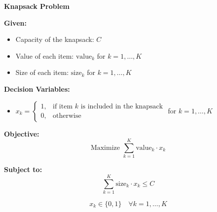 \documentclass{article}
\begin{document}
\textbf{Knapsack Problem}

\textbf{Given:}
\begin{itemize}
    \item Capacity of the knapsack: \( C \)
    \item Value of each item: \( \text{value}_k \) for \( k = 1, \ldots, K \)
    \item Size of each item: \( \text{size}_k \) for \( k = 1, \ldots, K \)
\end{itemize}

\textbf{Decision Variables:}
\begin{itemize}
    \item \( x_k = \begin{cases} 
    1, & \text{if item } k \text{ is included in the knapsack} \\
    0, & \text{otherwise}
    \end{cases} \) for \( k = 1, \ldots, K \)
\end{itemize}

\textbf{Objective:}
\[
\text{Maximize } \sum_{k=1}^{K} \text{value}_k \cdot x_k
\]

\textbf{Subject to:}
\[
\sum_{k=1}^{K} \text{size}_k \cdot x_k \leq C
\]

\[
x_k \in \{0, 1\} \quad \forall k = 1, \ldots, K
\]
\end{document}
